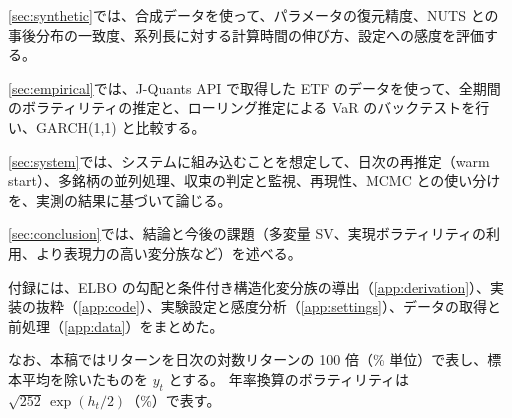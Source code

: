 \cref{sec:synthetic}では、合成データを使って、パラメータの復元精度、NUTS との事後分布の一致度、系列長に対する計算時間の伸び方、設定への感度を評価する。

\cref{sec:empirical}では、J-Quants API で取得した ETF のデータを使って、全期間のボラティリティの推定と、ローリング推定による VaR のバックテストを行い、GARCH(1,1) と比較する。

\cref{sec:system}では、システムに組み込むことを想定して、日次の再推定（warm start）、多銘柄の並列処理、収束の判定と監視、再現性、MCMC との使い分けを、実測の結果に基づいて論じる。

\cref{sec:conclusion}では、結論と今後の課題（多変量 SV、実現ボラティリティの利用、より表現力の高い変分族など）を述べる。

付録には、ELBO の勾配と条件付き構造化変分族の導出（\cref{app:derivation}）、実装の抜粋（\cref{app:code}）、実験設定と感度分析（\cref{app:settings}）、データの取得と前処理（\cref{app:data}）をまとめた。

なお、本稿ではリターンを日次の対数リターンの 100 倍（\% 単位）で表し、標本平均を除いたものを $y_t$ とする。
年率換算のボラティリティは $\sqrt{252}\, \exp(h_t/2)$（\%）で表す。
